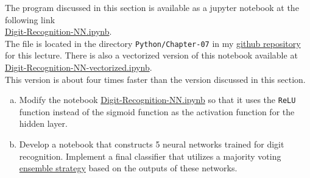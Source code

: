 The program discussed in this section is available as a jupyter notebook at the following link
\\[0.2cm]
\hspace*{1.3cm}
\href{https://github.com/karlstroetmann/Artificial-Intelligence/blob/master/Python/Chapter-07/Digit-Recognition-NN.ipynb}{Digit-Recognition-NN.ipynb}.
\\[0.2cm]
The file is located in the directory \texttt{Python/Chapter-07} in my
\href{https://github.com/karlstroetmann/Artificial-Intelligence}{github repository} for this lecture.
There is also a vectorized version of this notebook available at
\\[0.2cm]
\hspace*{1.3cm}
\href{https://github.com/karlstroetmann/Artificial-Intelligence/blob/master/Python/Chapter-07/Digit-Recognition-NN-vectorized.ipynb}{Digit-Recognition-NN-vectorized.ipynb}.
\\[0.2cm]
This version is about four times faster than the version discussed in this section.

\exercise
\begin{enumerate}[(a)]
\item Modify the notebook
      \href{https://github.com/karlstroetmann/Artificial-Intelligence/blob/master/Python/Chapter-07/Digit-Recognition-NN.ipynb}{Digit-Recognition-NN.ipynb}
        so that it uses the \texttt{ReLU} function instead of the sigmoid function as the activation function for the
        hidden layer.
\item Develop a notebook that constructs 5 neural networks trained for digit recognition. Implement a final
      classifier that utilizes a majority voting
      \href{https://en.wikipedia.org/wiki/Ensemble_learning}{ensemble strategy}  based on the outputs of these networks. 
\end{enumerate}


